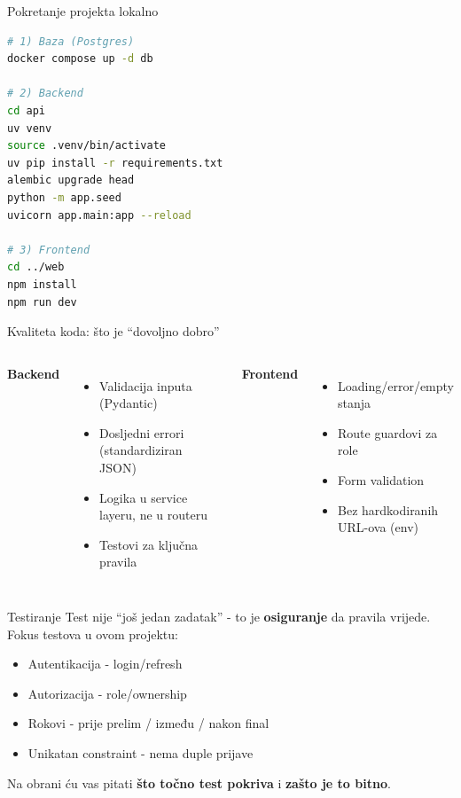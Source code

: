 \begin{frame}[fragile,shrink=5]{Pokretanje projekta lokalno}
\begin{lstlisting}[language=bash]
# 1) Baza (Postgres)
docker compose up -d db

# 2) Backend
cd api
uv venv
source .venv/bin/activate
uv pip install -r requirements.txt
alembic upgrade head
python -m app.seed
uvicorn app.main:app --reload

# 3) Frontend
cd ../web
npm install
npm run dev
\end{lstlisting}
\end{frame}

\begin{frame}{Kvaliteta koda: što je \enquote{dovoljno dobro}}
\begin{columns}[T]
\textbf{Backend}
\begin{itemize}
  \item Validacija inputa (Pydantic)
  \item Dosljedni errori (standardiziran JSON)
  \item Logika u service layeru, ne u routeru
  \item Testovi za ključna pravila
\end{itemize}

\textbf{Frontend}
\begin{itemize}
  \item Loading/error/empty stanja
  \item Route guardovi za role
  \item Form validation
  \item Bez hardkodiranih URL-ova (env)
\end{itemize}
\end{columns}
\end{frame}

\begin{frame}{Testiranje}
Test nije \enquote{još jedan zadatak} - to je \textbf{osiguranje} da pravila vrijede. Fokus testova u ovom projektu:

\begin{itemize}
  \item Autentikacija - login/refresh
  \item Autorizacija - role/ownership
  \item Rokovi - prije prelim / između / nakon final
  \item Unikatan constraint - nema duple prijave
\end{itemize}

\vspace{0.4em}
Na obrani ću vas pitati \textbf{što točno test pokriva} i \textbf{zašto je to bitno}.
\end{frame}


